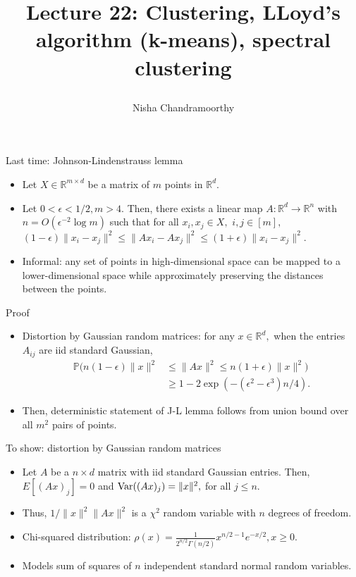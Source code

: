 \documentclass[final]{beamer}
\title{\begin{huge}{Lecture 22: Clustering, LLoyd's algorithm (k-means), spectral clustering}\end{huge}} %
\author{Nisha Chandramoorthy} %
\begin{document}
\frame{\titlepage}

\begin{frame}{Last time: Johnson-Lindenstrauss lemma}
\begin{itemize}
	\item Let $X \in \mathbb{R}^{m\times d}$ be a matrix of $m$ points in $\mathbb{R}^d.$
	\pause
\item Let $0 < \epsilon < 1/2, m > 4.$ Then, there exists a linear map $A: \mathbb{R}^d \to \mathbb{R}^n$ with $n = O(\epsilon^{-2} \log m)$ such that for all $x_i,x_j \in X,$ $i, j \in [m],$ $(1-\epsilon)\|x_i-x_j\|^2 \leq \|Ax_i - Ax_j\|^2 \leq (1+\epsilon)\|x_i-x_j\|^2.$
	\pause
	\item Informal: any set of points in high-dimensional space can be mapped to a lower-dimensional space while approximately preserving the distances between the points.
\end{itemize}
\end{frame}
\begin{frame}{Proof}

\begin{itemize}
	\item Distortion by Gaussian random matrices: for any $x \in \mathbb{R}^d,$ when the entries $A_{ij}$ are iid standard Gaussian, 
		\begin{align*}
			\mathbb{P}(n(1 - \epsilon)\|x\|^2 &\leq \|Ax\|^2 \leq n(1+\epsilon)\|x\|^2)\\
			&\geq 1 - 2\exp(-(\epsilon^2 - \epsilon^3) n/4).
		\end{align*}
	\pause
\item Then, deterministic statement of J-L lemma follows from union bound over all $m^2$ pairs of points.
\end{itemize}

\end{frame}
\begin{frame}{To show: distortion by Gaussian random matrices}
\begin{itemize}
	\item Let $A$ be a $n \times d$ matrix with iid standard Gaussian entries. Then, $E[(Ax)_j] = 0$ and ${\rm Var}((Ax)_j) = \|x\|^2,$ for all $j \leq n.$
	\pause
	\item Thus, $1/\|x\|^2 \|Ax\|^2$ is a $\chi^2$ random variable with $n$ degrees of freedom.
	\pause
	\item Chi-squared distribution: $\rho(x) = \frac{1}{2^{n/2}\Gamma(n/2)} x^{n/2 - 1} e^{-x/2}, x\geq 0.$
	\pause
	\item Models sum of squares of $n$ independent standard normal random variables.
\end{itemize}
\end{frame}
\end{document}
